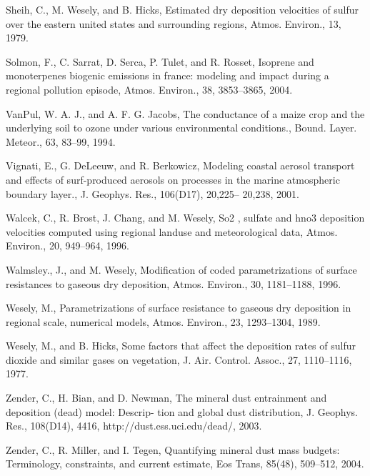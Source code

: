 \begin{description}
Sheih, C., M. Wesely, and B. Hicks, Estimated dry deposition velocities of sulfur over the eastern united
  states and surrounding regions, Atmos. Environ., 13, 1979.
\item
Solmon, F., C. Sarrat, D. Serca, P. Tulet, and R. Rosset, Isoprene and monoterpenes biogenic emissions in
  france: modeling and impact during a regional pollution episode, Atmos. Environ., 38, 3853–3865, 2004.
\item
VanPul, W. A. J., and A. F. G. Jacobs, The conductance of a maize crop and the underlying soil to ozone
  under various environmental conditions., Bound. Layer. Meteor., 63, 83–99, 1994.
\item
Vignati, E., G. DeLeeuw, and R. Berkowicz, Modeling coastal aerosol transport and effects of surf-produced
  aerosols on processes in the marine atmospheric boundary layer., J. Geophys. Res., 106(D17), 20,225–
  20,238, 2001.
\item
Walcek, C., R. Brost, J. Chang, and M. Wesely, So2 , sulfate and hno3 deposition velocities computed using
  regional landuse and meteorological data, Atmos. Environ., 20, 949–964, 1996.
\item
Walmsley., J., and M. Wesely, Modification of coded parametrizations of surface resistances to gaseous dry
  deposition, Atmos. Environ., 30, 1181–1188, 1996.
\item
Wesely, M., Parametrizations of surface resistance to gaseous dry deposition in regional scale, numerical
  models, Atmos. Environ., 23, 1293–1304, 1989.
\item
Wesely, M., and B. Hicks, Some factors that affect the deposition rates of sulfur dioxide and similar gases
  on vegetation, J. Air. Control. Assoc., 27, 1110–1116, 1977.
\item
Zender, C., H. Bian, and D. Newman, The mineral dust entrainment and deposition (dead) model: Descrip-
  tion and global dust distribution, J. Geophys. Res., 108(D14), 4416, http://dust.ess.uci.edu/dead/, 2003.
\item
Zender, C., R. Miller, and I. Tegen, Quantifying mineral dust mass budgets: Terminology, constraints, and
  current estimate, Eos Trans, 85(48), 509–512, 2004.

\end{description}

